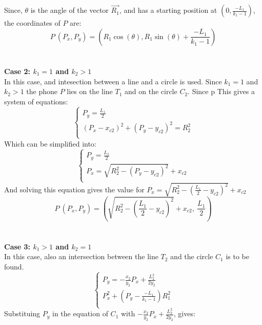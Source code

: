 \documentclass[a4paper,12pt]{article}
\begin{document}
Since, $\theta$ is the angle of the vector $\vec{R_1}$, and has a starting position at $\left(0,\frac{-L_1}{k_1-1}\right)$, the coordinates of $P$ are:
\begin{equation}
    P~(P_x, P_y) = \left(R_1\cos(\theta), R_1\sin(\theta)+\frac{-L_1}{k_1-1}\right)
\label{eq:case1}
\end{equation}
\\\\
\textbf{Case 2: $k_1=1$ and $k_2>1$ }
\\
In this case, and intesection between a line and a circle is used. Since $k_1=1$ and $k_2>1$ the phone $P$ lies on the line $T_1$ and on the circle $C_2$. Since p
This gives a system of equations:
\begin{equation}
    \begin{cases}
        P_y=\frac{L_1}{2} \\ 
        (P_x-x_{c2})^2 + (P_y-y_{c2})^2 = R_2^2\\
    \end{cases}
\label{eq:system2}
\end{equation}
Which can be simplified into:
\begin{equation*}
    \begin{cases}
        P_y=\frac{L_1}{2} \\ 
        P_x = \sqrt{R_2^2 - (P_y-y_{c2})^2} + x_{c2}\\
    \end{cases}
\end{equation*}
And solving this equation gives the value for $P_x=  \sqrt{R_2^2 - \left(\frac{L_1}{2}-y_{c2}\right)^2} + x_{c2}$
\begin{equation}
    P~(P_x, P_y) = \left(\sqrt{R_2^2 - \left(\frac{L_1}{2}-y_{c2}\right)^2} + x_{c2},~\frac{L_1}{2}\right)
\label{eq:case2}
\end{equation}
\\\\
\textbf{Case 3: $k_1>1$ and $k_2=1$ }
\\
In this case, also an intersection between the line $T_2$ and the circle $C_1$ is to be found. 
\begin{equation*}
    \begin{cases}
        P_y=-\frac{x_{2}}{y_{2}}P_x+\frac{L_2^2}{2y_{2}}\\ 
        P_x^2 + \left(P_y - \frac{-L_1}{k_1-1}\right)R_1^2\\
    \end{cases}
\end{equation*}
Substituing $P_y$ in the equation of $C_1$ with $-\frac{x_{2}}{y_{2}}P_x+\frac{L_2^2}{2y_{2}}$, gives:
\end{document}
